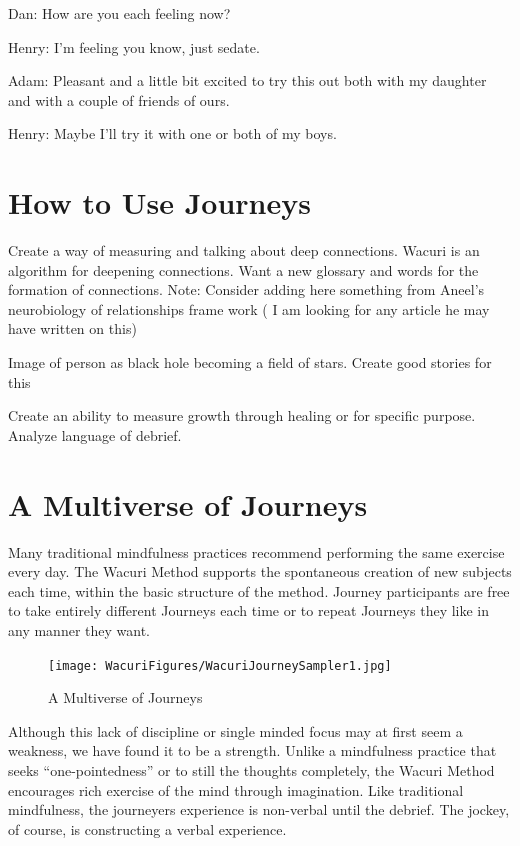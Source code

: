 \documentclass[12pt]{book}
\begin{document}
Dan: How are you each feeling now?

Henry: I'm feeling you know, just sedate.

Adam: Pleasant and a little bit excited to try this out both with my daughter and with a couple of friends of ours.

Henry: Maybe I'll try it with one or both of my boys.

\hrulefill


\chapter{How to Use Journeys}


Create a way of measuring and talking about deep connections. Wacuri is an algorithm for deepening connections. Want a new glossary and words for the formation of connections. Note: Consider adding here something from Aneel's neurobiology of relationships frame work ( I am looking for any article he may have written on this)

Image of person as black hole becoming a field of stars. Create good stories for this

Create an ability to measure growth through healing or for specific purpose. Analyze language of debrief.


\chapter{ A Multiverse of Journeys}

Many traditional mindfulness practices recommend performing the same exercise every day. The Wacuri Method supports the spontaneous creation of new subjects each time, within the basic structure of the method. Journey participants are free to take entirely different Journeys each time or to repeat Journeys they like in any manner they want.

\begin{figure}
  \centering
     \texttt{[image: WacuriFigures/WacuriJourneySampler1.jpg]}
     \caption{A Multiverse of Journeys}
  \label{fig:journey}     
\end{figure}
					
Although this lack of discipline or single minded focus may at first seem a weakness, we have found it to be a strength. Unlike a mindfulness practice that seeks “one-pointedness” or to still the thoughts completely,
the Wacuri Method encourages rich exercise of the mind through imagination.
Like traditional mindfulness, the journeyers experience is non-verbal until the debrief.
The jockey, of course, is constructing a verbal experience.
					
\end{document}

